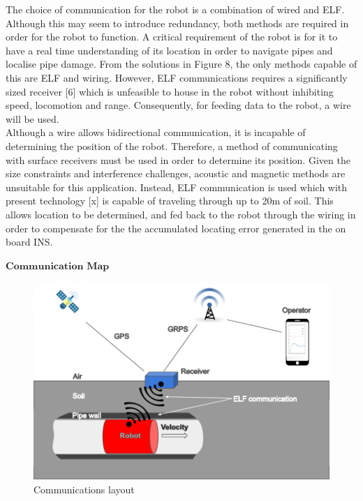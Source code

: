 \documentclass[11pt]{article}		%
\begin{document}
        
        The choice of communication for the robot is a combination of wired and ELF. Although this may seem to introduce redundancy, both methods are required in order for the robot to function.
         A critical requirement of the robot is for it to have a real time understanding of its location in order to navigate pipes and localise pipe damage. From the solutions in Figure 8, the only methods capable of this are ELF and wiring. However, ELF communications requires a significantly sized receiver [6] which is unfeasible to house in the robot without inhibiting speed, locomotion and range. Consequently, for feeding data to the robot, a wire will be used.\\ 
         \hspace*{3ex}Although a wire allows bidirectional communication, it is incapable of determining the position of the robot. Therefore, a method of communicating with surface receivers must be used in order to determine its position. Given the size constraints and interference challenges, acoustic and magnetic methods are unsuitable for this application. Instead, ELF communication is used which with present technology [x] is capable of traveling through up to 20m of soil. This allows location to be determined, and fed back to the robot through the wiring in order to compensate for the the accumulated locating error generated in the on board INS.

         
        $\textbf{Communication Map}$
        
        \begin{figure}[h]
			\centering
			\includegraphics[scale=1]{COMMS.pdf}
			\caption{Communications layout}
			\label{comparison comms}
		\end{figure}
\end{document}
